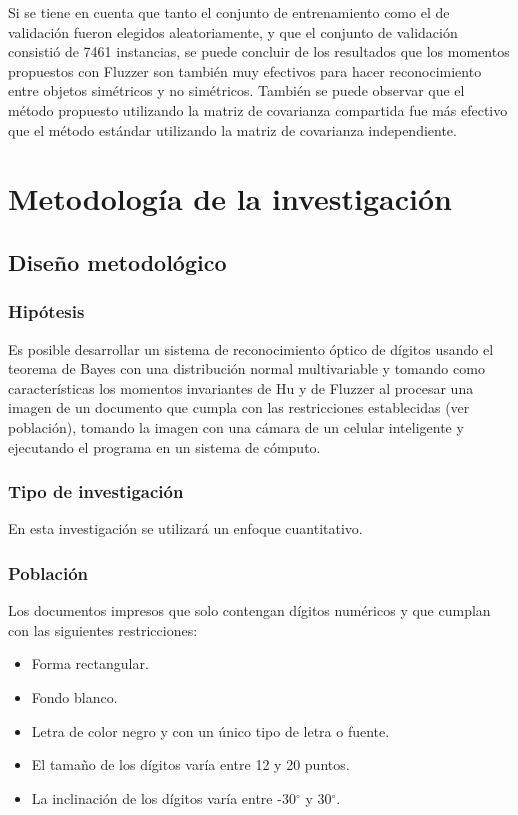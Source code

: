 \documentclass[a4paper, 11pt, oneside]{report}
\begin{document}
Si se tiene en cuenta que tanto el conjunto de entrenamiento como el de validación fueron elegidos aleatoriamente, y que el conjunto de validación consistió de 7461 instancias, se puede concluir de los resultados que los momentos propuestos con Fluzzer son también muy efectivos para hacer reconocimiento entre objetos simétricos y no simétricos. También se puede observar que el método propuesto utilizando la matriz de covarianza compartida fue más efectivo que el método estándar utilizando la matriz de covarianza independiente.


\chapter{Metodología de la investigación}
\label{chap:metodology}

\section{Diseño metodológico}

\subsection{Hipótesis}

Es posible desarrollar un sistema de reconocimiento óptico de dígitos usando el teorema de Bayes con una distribución normal multivariable y tomando como características los momentos invariantes de Hu y de Fluzzer al procesar una imagen de un documento que cumpla con las restricciones establecidas (ver población), tomando la imagen con una cámara de un celular inteligente y ejecutando el programa en un sistema de cómputo.
	
\subsection{Tipo de investigación}

En esta investigación se utilizará un enfoque cuantitativo.

\subsection{Población}
\label{sect:population}

Los documentos impresos que solo contengan dígitos numéricos y que cumplan con las siguientes restricciones:

\begin{itemize}

	\item Forma rectangular.

	\item Fondo blanco.

	\item Letra de color negro y con un único tipo de letra o fuente.

	\item El tamaño de los dígitos varía entre 12 y 20 puntos.

	\item La inclinación de los dígitos varía entre -30$^{\circ}$ y 30$^{\circ}$.

\end{itemize}
\end{document}
